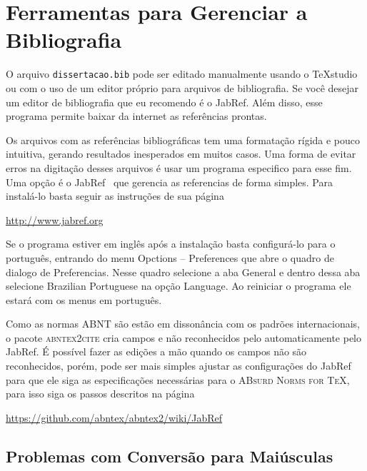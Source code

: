 \documentclass[fleqn]{icat-ufal}
\newcommand{\TeXstudio}{\TeX\textsf{studio}}
\newcommand{\JabRef}   {\textsf{JabRef}}
\newcommand{\bibfile}  {\texttt{dissertacao.bib}}
\begin{document}
\section{Ferramentas para Gerenciar a Bibliografia}
\label{sec:ferramenta_para_gerenciar_a_bibliografia}

O arquivo \bibfile{} pode ser editado manualmente usando o 
\TeXstudio{} ou com o uso de um editor próprio para arquivos de bibliografia.
Se você desejar um editor de bibliografia que eu recomendo é o \JabRef{}.
Além disso, esse programa permite baixar da internet as referências prontas.

Os arquivos com as referências bibliográficas tem uma formatação rígida e
pouco intuitiva, gerando resultados inesperados em muitos casos. Uma forma 
de evitar erros na digitação desses arquivos é usar um programa especifico 
para esse fim. Uma opção é o \JabRef{}~\cite{JABREF} que gerencia as referencias 
de forma simples. Para instalá-lo basta seguir as instruções de sua página 
\begin{center}
    \url{http://www.jabref.org}
\end{center}
Se o programa estiver em inglês após a instalação basta configurá-lo para o 
português, entrando do menu \textsf{Opctions -- Preferences} que abre o 
quadro de dialogo de Preferencias. Nesse quadro selecione a aba \textsf{General}
e dentro dessa aba selecione \textsf{Brazilian Portuguese} na opção \textsf{Language}.
Ao reiniciar o programa ele estará com os menus em português.

Como as normas ABNT são estão em dissonância com os padrões internacionais, 
o pacote \textsc{abntex2cite} cria campos e não reconhecidos pelo automaticamente
pelo \JabRef{}. 
É possível fazer as edições a mão quando os campos não são reconhecidos,
porém, pode ser mais simples ajustar as configurações do \JabRef{} para que
ele siga as especificações necessárias para o \textsc{ABsurd Norms for TeX},
para isso siga os passos descritos na página
\begin{center}
    \url{https://github.com/abntex/abntex2/wiki/JabRef}
\end{center}

\subsection{Problemas com Conversão para Maiúsculas}
\end{document}
